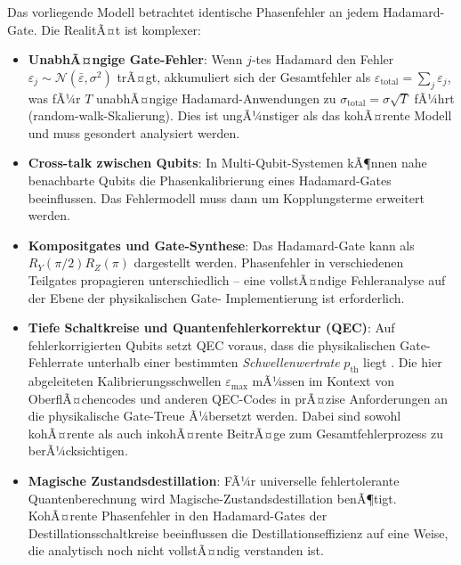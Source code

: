 ﻿\documentclass[11pt,a4paper]{article}
\theoremstyle{definition}
\newcommand{\eps}{\varepsilon}
\begin{document}
Das vorliegende Modell betrachtet identische Phasenfehler an jedem
Hadamard-Gate.  Die RealitÃ¤t ist komplexer:

\begin{itemize}
  \item \textbf{UnabhÃ¤ngige Gate-Fehler}: Wenn $j$-tes Hadamard den Fehler
        $\eps_j \sim\mathcal{N}(\bar\eps, \sigma^2)$ trÃ¤gt, akkumuliert
        sich der Gesamtfehler als
        $\eps_{\mathrm{total}} = \sum_j \eps_j$,
        was fÃ¼r $T$ unabhÃ¤ngige Hadamard-Anwendungen zu
        $\sigma_{\mathrm{total}} = \sigma\sqrt{T}$ fÃ¼hrt (random-walk-Skalierung).
        Dies ist ungÃ¼nstiger als das kohÃ¤rente Modell und muss gesondert
        analysiert werden.

  \item \textbf{Cross-talk zwischen Qubits}: In Multi-Qubit-Systemen kÃ¶nnen
        nahe benachbarte Qubits die Phasenkalibrierung eines Hadamard-Gates
        beeinflussen.  Das Fehlermodell muss dann um Kopplungsterme erweitert werden.

  \item \textbf{Kompositgates und Gate-Synthese}: Das Hadamard-Gate kann
        als $R_Y(\pi/2)R_Z(\pi)$ dargestellt werden.  Phasenfehler in
        verschiedenen Teilgates propagieren unterschiedlich -- eine
        vollstÃ¤ndige Fehleranalyse auf der Ebene der physikalischen Gate-
        Implementierung ist erforderlich.

  \item \textbf{Tiefe Schaltkreise und Quantenfehlerkorrektur (QEC)}:
        Auf fehlerkorrigierten Qubits setzt QEC voraus, dass die physikalischen
        Gate-Fehlerrate unterhalb einer bestimmten \emph{Schwellenwertrate}
        $p_{\mathrm{th}}$ liegt \cite{Aharonov1997,Knill1998}.  Die hier
        abgeleiteten Kalibrierungsschwellen $\eps_{\max}$ mÃ¼ssen im Kontext
        von OberflÃ¤chencodes \cite{Fowler2012} und anderen QEC-Codes in
        prÃ¤zise Anforderungen an die physikalische Gate-Treue Ã¼bersetzt werden.
        Dabei sind sowohl kohÃ¤rente als auch inkohÃ¤rente BeitrÃ¤ge zum
        Gesamtfehlerprozess zu berÃ¼cksichtigen.

  \item \textbf{Magische Zustandsdestillation}: FÃ¼r universelle
        fehlertolerante Quantenberechnung wird Magische-Zustandsdestillation
        \cite{Bravyi2005} benÃ¶tigt.  KohÃ¤rente Phasenfehler in den
        Hadamard-Gates der Destillationsschaltkreise beeinflussen die
        Destillationseffizienz auf eine Weise, die analytisch noch nicht
        vollstÃ¤ndig verstanden ist.
\end{itemize}
\end{document}
